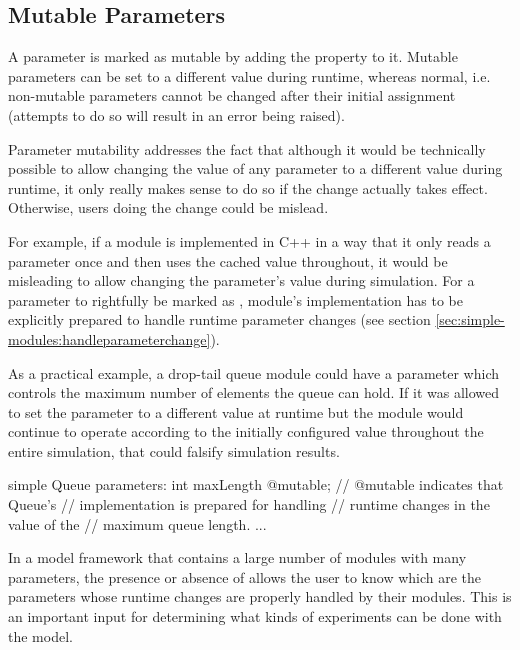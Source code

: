 \subsection{Mutable Parameters}
\label{sec:ned-lang:mutable}

A parameter is marked as mutable by adding the  property to it.
Mutable parameters can be set to a different value during runtime, whereas
normal, i.e. non-mutable parameters cannot be changed after their initial
assignment (attempts to do so will result in an error being raised).

Parameter mutability addresses the fact that although it would be technically
possible to allow changing the value of any parameter to a different value
during runtime, it only really makes sense to do so if the change actually takes
effect. Otherwise, users doing the change could be mislead.

For example, if a module is implemented in C++ in a way that it only reads a
parameter once and then uses the cached value throughout, it would be misleading
to allow changing the parameter's value during simulation. For a parameter to
rightfully be marked as , module's implementation has to be
explicitly prepared to handle runtime parameter changes (see section
\ref{sec:simple-modules:handleparameterchange}).

As a practical example, a drop-tail queue module could have a 
parameter which controls the maximum number of elements the queue can hold. If
it was allowed to set the  parameter to a different value at
runtime but the module would continue to operate according to the initially
configured value throughout the entire simulation, that could falsify simulation
results.

\begin{ned}
simple Queue
{
    parameters:
        int maxLength @mutable; // @mutable indicates that Queue's
                                // implementation is prepared for handling
                                // runtime changes in the value of the
                                // maximum queue length.
        ...
}
\end{ned}

In a model framework that contains a large number of modules with many
parameters, the presence or absence of  allows the user to know
which are the parameters whose runtime changes are properly handled by their
modules. This is an important input for determining what kinds of experiments
can be done with the model.

